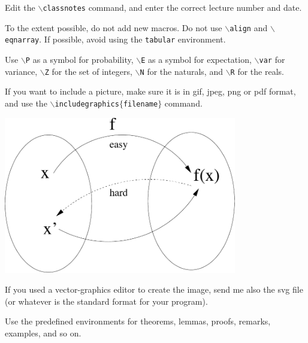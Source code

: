 





Edit the {\tt $\backslash$classnotes} command, and enter the correct
lecture number and date.

To the extent possible, do not add new macros. Do not use
{\tt $\backslash$align} and {\tt $\backslash$eqnarray}. If possible,
avoid using the {\tt tabular} environment.

Use {\tt $\backslash$P} as a symbol for probability,
{\tt $\backslash$E} as a symbol for expectation,
{\tt $\backslash$var} for variance,
{\tt $\backslash$Z} for the set of integers, 
{\tt $\backslash$N} for the naturals,
and {\tt $\backslash$R} for the reals.

If you want to include a picture, make sure it is in gif, jpeg, png
or pdf format, and use the {\tt $\backslash$includegraphics$\{$filename$\}$}
command.

\includegraphics[width=4in]{fig1.pdf}

If you used a vector-graphics editor to create the image, send me also
the svg file (or whatever is the standard format for your program).

Use the predefined environments for theorems, lemmas, proofs, remarks, examples, 
and so on.

